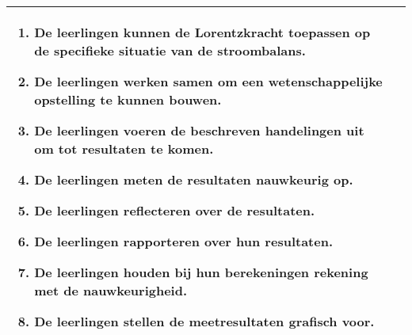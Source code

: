 \begin{landscape}
\begin{tabularx}{1.56\textwidth}{|p{}|X|}
		\vspace{-0.75cm}
		\begin{enumerate}[itemsep=0.08\baselineskip]
			\item De leerlingen kunnen de Lorentzkracht toepassen op de specifieke situatie van de stroombalans.
			\item De leerlingen werken samen om een wetenschappelijke opstelling te kunnen bouwen.
			\item De leerlingen voeren de beschreven handelingen uit om tot resultaten te komen.
			\item De leerlingen meten de resultaten nauwkeurig op.
			\item De leerlingen reflecteren over de resultaten.
			\item De leerlingen rapporteren over hun resultaten.
			\item De leerlingen houden bij hun berekeningen rekening met de nauwkeurigheid.
			\item De leerlingen stellen de meetresultaten grafisch voor.
		\end{enumerate} \\\hline
	\end{tabularx}



\end{landscape}

